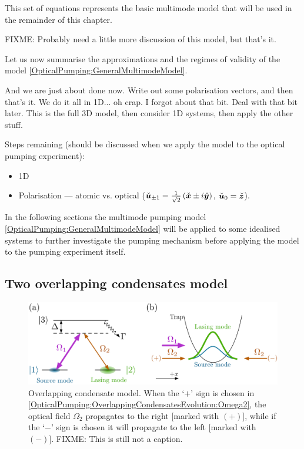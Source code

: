 This set of equations represents the basic multimode model that will be used in the remainder of this chapter.

FIXME: Probably need a little more discussion of this model, but that's it.

\parasep

Let us now summarise the approximations and the regimes of validity of the model \eqref{OpticalPumping:GeneralMultimodeModel}.

And we are just about done now.  Write out some polarisation vectors, and then that's it.  We do it all in 1D... oh crap. I forgot about that bit.  Deal with that bit later. This is the full 3D model, then consider 1D systems, then apply the other stuff.

Steps remaining (should be discussed when we apply the model to the optical pumping experiment):
\begin{itemize}
    \item 1D
    \item Polarisation --- atomic vs. optical ($\check{\bm{u}}_{\pm1} = \frac{1}{\sqrt{2}}\left(\check{\bm{x}} \pm i \check{\bm{y}}\right)$, $\check{\bm{u}}_0 = \check{\bm{z}}$).
\end{itemize}

In the following sections the multimode pumping model \eqref{OpticalPumping:GeneralMultimodeModel} will be applied to some idealised systems to further investigate the pumping mechanism before applying the model to the pumping experiment itself.

\subsection{Two overlapping condensates model}
\label{OpticalPumping:SimpleModels:OverlappingCondensatesModel}

\begin{figure}
    \centering
    \includegraphics[width=14cm]{OverlappingCondensateModel}
    \caption{Overlapping condensate model. When the `$+$' sign is chosen in \eqref{OpticalPumping:OverlappingCondensatesEvolution:Omega2}, the optical field $\Omega_2$ propagates to the right [marked with $(+)$], while if the `$-$' sign is chosen it will propagate to the left [marked with $(-)$]. FIXME: This is still not a caption.}
    \label{OpticalPumping:OverlappingCondensateModel}
\end{figure}

